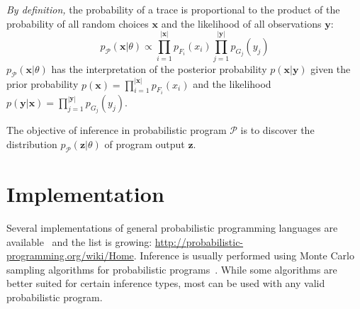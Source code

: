 \documentclass[a4paper,oneside]{article}
\begin{document}
\emph{By definition,} the probability of a trace is proportional
to the product of the probability of all random choices
$\pmb{x}$ and the likelihood of all observations $\pmb{y}$:
\begin{equation}
	p_{\mathcal{P}}(\pmb{x}|\theta) \propto \prod_{i=1}^{\left|\pmb{x}\right|}
	p_{F_i}(x_i) \prod_{j=1}^{\left|\pmb{y}\right|}p_{G_j}(y_{j})
  \label{eqn:p-trace}
\end{equation}
$p_{\mathcal{P}}(\pmb{x}|\theta)$ has the interpretation of the
posterior probability $p(\pmb{x}|\pmb{y})$ given the prior
probability $p(\pmb{x}) = \prod_{i=1}^{\left|\pmb{x}\right|}
p_{F_i}(x_i)$ and the likelihood $p(\pmb{y}|\pmb{x}) =
\prod_{j=1}^{\left|\pmb{y}\right|} p_{G_j}(y_{j})$.

The objective of inference in probabilistic program
$\mathcal{P}$ is to discover the distribution
$p_{\mathcal{P}}(\pmb{z}|\theta)$ of program output $\pmb{z}$.

\section*{Implementation}

Several implementations of general probabilistic programming
languages are available~\cite{GMR+08,MSP14,WVM14} and the list
is growing: \url{http://probabilistic-programming.org/wiki/Home}.
Inference is usually performed using Monte Carlo sampling
algorithms for probabilistic programs~\cite{WSG11,WVM14,PWD+14}.
While some algorithms are better suited for certain inference
types, most can be used with any valid probabilistic program.

 
\end{document}
